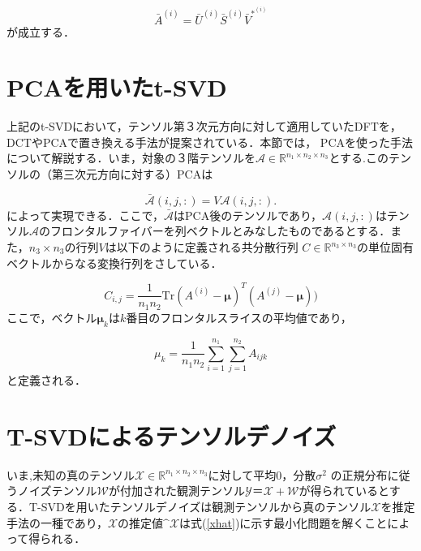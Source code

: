 \begin{equation}
\label{frontalslice_use_t-svd}
\bar{A}^{(i)} = \bar{U}^{(i)} \bar{S}^{(i)} \bar{V}^*^{(i)}
\end{equation}が成立する．



\section{PCAを用いたt-SVD}
上記のt-SVDにおいて，テンソル第３次元方向に対して適用していたDFTを，DCTやPCAで置き換える手法が提案されている．本節では，
PCAを使った手法について解説する．いま，対象の３階テンソルを$\mathcal{A}\in \mathbb{R}^{n_1\times n_2\times n_3}$とする.このテンソルの（第三次元方向に対する）PCAは

\begin{equation}
    \label{eq:yx}
    \bar{\mathcal{A}}(i,j,:)=V\mathcal{A}(i,j,:).
\end{equation}によって実現できる．ここで，$\bar{\mathcal{A}}$はPCA後のテンソルであり，$\mathcal{A}(i,j,:)$はテンソル$\mathcal{A}$のフロンタルファイバーを列ベクトルとみなしたものであるとする．また，$n_3\times n_3$の行列$V$は以下のように定義される共分散行列 $C \in \mathbb{R}^{n_3 \times n_3}$の単位固有ベクトルからなる変換行列をさしている．

\begin{equation}
    \label{eq:yx}
    C_{i,j} = \frac{1}{n_1n_2} \mathrm{Tr}(A^{(i)}-\bm{\mu})^T(A^{(j)}-\bm{\mu}))
\end{equation}ここで，ベクトル$\bm{\mu}_k$は$k$番目のフロンタルスライスの平均値であり，

\begin{equation}
    \label{eq:yx}
    \mu_k = \frac{1}{n_1n_2} \sum_{i=1}^{n_1}\sum_{j=1}^{n_2}A_{ijk}
\end{equation}と定義される．



\section{T-SVDによるテンソルデノイズ}
いま,未知の真のテンソル$\mathcal{X} \in \mathbb{R}^{n_1 \times n_2 \times n_3}$に対して平均0，分散$\sigma^2$ の正規分布に従うノイズテンソル$\mathcal{W}$が付加された観測テンソル$\mathcal{Y}＝\mathcal{X}+\mathcal{W}$が得られているとする．T-SVDを用いたテンソルデノイズは観測テンソルから真のテンソル$\mathcal{X}$を推定手法の一種であり，$\mathcal{X}$の推定値$\^{\mathcal{X}}$は式(\ref{xhat})に示す最小化問題を解くことによって得られる．

